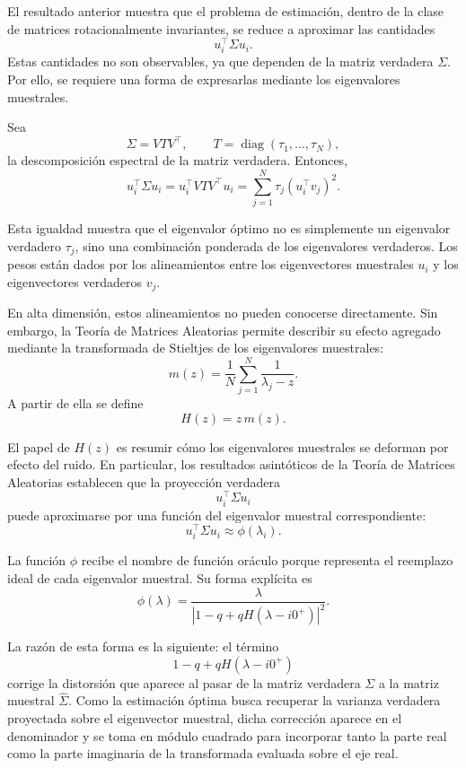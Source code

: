 \documentclass[letterpaper,12pt,oneside]{book}
\begin{document}


El resultado anterior muestra que el problema de estimación, dentro de la clase de matrices rotacionalmente invariantes, se reduce a aproximar las cantidades
\[
u_i^\top \Sigma u_i.
\]
Estas cantidades no son observables, ya que dependen de la matriz verdadera $\Sigma$. Por ello, se requiere una forma de expresarlas mediante los eigenvalores muestrales.

Sea
\[
\Sigma = V T V^\top,
\qquad
T=\operatorname{diag}(\tau_1,\dots,\tau_N),
\]
la descomposición espectral de la matriz verdadera. Entonces,
\[
u_i^\top \Sigma u_i
=
u_i^\top VTV^\top u_i
=
\sum_{j=1}^N \tau_j (u_i^\top v_j)^2.
\]

Esta igualdad muestra que el eigenvalor óptimo no es simplemente un eigenvalor verdadero $\tau_j$, sino una combinación ponderada de los eigenvalores verdaderos. Los pesos están dados por los alineamientos entre los eigenvectores muestrales $u_i$ y los eigenvectores verdaderos $v_j$.

En alta dimensión, estos alineamientos no pueden conocerse directamente. Sin embargo, la Teoría de Matrices Aleatorias permite describir su efecto agregado mediante la transformada de Stieltjes de los eigenvalores muestrales:
\[
m(z)
=
\frac{1}{N}\sum_{j=1}^N
\frac{1}{\lambda_j-z}.
\]
A partir de ella se define
\[
H(z)=z\,m(z).
\]

El papel de $H(z)$ es resumir cómo los eigenvalores muestrales se deforman por efecto del ruido. En particular, los resultados asintóticos de la Teoría de Matrices Aleatorias establecen que la proyección verdadera
\[
u_i^\top \Sigma u_i
\]
puede aproximarse por una función del eigenvalor muestral correspondiente:
\[
u_i^\top \Sigma u_i
\approx
\phi(\lambda_i).
\]

La función $\phi$ recibe el nombre de función oráculo porque representa el reemplazo ideal de cada eigenvalor muestral. Su forma explícita es
\[
\phi(\lambda)
=
\frac{\lambda}
{\left|1-q+qH(\lambda-i0^+)\right|^2}.
\]

La razón de esta forma es la siguiente: el término
\[
1-q+qH(\lambda-i0^+)
\]
corrige la distorsión que aparece al pasar de la matriz verdadera $\Sigma$ a la matriz muestral $\widehat{\Sigma}$. Como la estimación óptima busca recuperar la varianza verdadera proyectada sobre el eigenvector muestral, dicha corrección aparece en el denominador y se toma en módulo cuadrado para incorporar tanto la parte real como la parte imaginaria de la transformada evaluada sobre el eje real.
\end{document}
